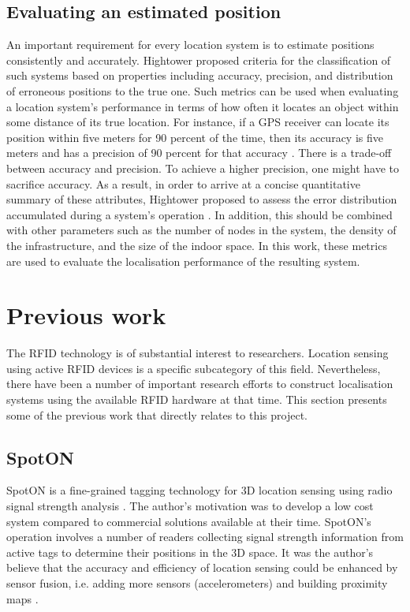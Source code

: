 \subsection{Evaluating an estimated position}

An important requirement for every location system is to estimate positions consistently and accurately. Hightower \cite{Hightower2001c} proposed criteria for the classification of such systems based on properties including accuracy, precision, and distribution of erroneous positions to the true one. Such metrics can be used when evaluating a location system's performance in terms of how often it locates an object within some distance of its true location. For instance, if a GPS receiver can locate its position within five meters for 90 percent of the time, then its accuracy is five meters and has a precision of 90 percent for that accuracy \cite{Hightower2001}. There is a trade-off between accuracy and precision. To achieve a higher precision, one might have to sacrifice accuracy. As a result, in order to arrive at a concise quantitative summary of these attributes, Hightower proposed to assess the error distribution accumulated during a system's operation \cite{Hightower2001}. In addition, this should be combined with other parameters such as the number of nodes in the system, the density of the infrastructure, and the size of the indoor space. In this work, these metrics are used to evaluate the localisation performance of the resulting system.

\section{Previous work}
\label{sec:prevwork}

The RFID technology is of substantial interest to researchers. Location sensing using active RFID devices is a specific subcategory of this field. Nevertheless, there have been a number of important research efforts to construct localisation systems using the available RFID hardware at that time. This section presents some of the previous work that directly relates to this project.


\subsection{SpotON}

SpotON is a fine-grained tagging technology for 3D location sensing using radio signal strength analysis \cite{Hightower2000}. The author's motivation was to develop a low cost system compared to commercial solutions available at their time. SpotON's operation involves a number of readers collecting signal strength information from active tags to determine their positions in the 3D space. It was the author's believe that the accuracy and efficiency of location sensing could be enhanced by sensor fusion, i.e. adding more sensors (accelerometers) and building proximity maps \cite{Hightower2000}.


